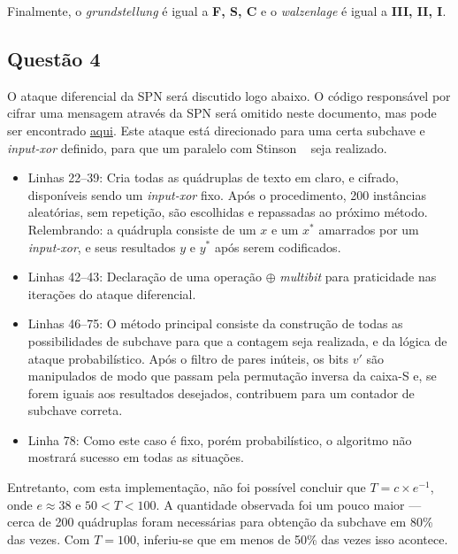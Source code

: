 \documentclass{../sftex/sftex}
\begin{document}
Finalmente, o \textit{grundstellung} é igual a \textbf{F, S, C} e o
\textit{walzenlage} é igual a \textbf{III, II, I}.

\subsection*{Questão 4}

O ataque diferencial da SPN será discutido logo abaixo. O código responsável
por cifrar uma mensagem através da SPN será omitido neste documento, mas pode
ser encontrado \href{https://github.com/zambonin/UFSC-INE5451/blob/master/classical/spn.py}{aqui}.
Este ataque está direcionado para uma certa subchave e \textit{input-xor}
definido, para que um paralelo com Stinson
~\cite[p. 94]{Stinson:2002:CTP:515609} seja realizado.



\begin{itemize}

    \item Linhas 22--39: Cria todas as quádruplas de texto em claro, e cifrado,
        disponíveis sendo um \textit{input-xor} fixo. Após o procedimento, 200
        instâncias aleatórias, sem repetição, são escolhidas e repassadas ao
        próximo método. Relembrando: a quádrupla consiste de um $x$ e um $x^*$
        amarrados por um \textit{input-xor}, e seus resultados $y$ e $y^*$ após
        serem codificados.

    \item Linhas 42--43: Declaração de uma operação $\oplus$ \textit{multibit}
        para praticidade nas iterações do ataque diferencial.

    \item Linhas 46--75: O método principal consiste da construção de todas as
        possibilidades de subchave para que a contagem seja realizada, e da
        lógica de ataque probabilístico. Após o filtro de pares inúteis, os
        bits $v'$ são manipulados de modo que passam pela permutação inversa
        da caixa-S e, se forem iguais aos resultados desejados, contribuem
        para um contador de subchave correta.

    \item Linha 78: Como este caso é fixo, porém probabilístico, o algoritmo
        não mostrará sucesso em todas as situações.

\end{itemize}

Entretanto, com esta implementação, não foi possível concluir que
$T = c \times e^{-1}$, onde $e \approx 38$ e $50 < T < 100$. A quantidade
observada foi um pouco maior --- cerca de 200 quádruplas foram necessárias para
obtenção da subchave em 80\% das vezes. Com $T = 100$, inferiu-se que em menos
de 50\% das vezes isso acontece.



\end{document}
